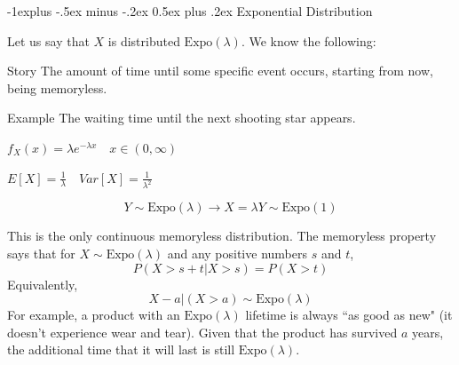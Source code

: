\documentclass[10pt,landscape]{article}
\makeatletter
\newcommand{\Expo}{\textrm{Expo}}
\renewcommand{\subsection}{\@startsection{subsection}{2}{0mm}%
{-1explus -.5ex minus -.2ex}%
{0.5ex plus .2ex}%
{\normalfont\normalsize\bfseries}}
\makeatother
\begin{document}
\begin{multicols*}{3}
        \subsection{Exponential Distribution}

        Let us say that $X$ is distributed $\Expo(\lambda)$. We know the following:
        \begin{description}
            \item{Story} The amount of time until some specific event occurs, starting from now, being memoryless. \item{Example} The waiting time until the next shooting star appears.

            \item[PDF] $f_X(x) = \lambda e^{-\lambda x} \quad x \in (0, \infty)$
            \item[Moments] $E[X]=\frac{1}{\lambda} \quad Var[X] = \frac{1}{\lambda^2}$
            \item[Expos as a rescaled Expo(1)]
            \[Y \sim \Expo(\lambda) \rightarrow X = \lambda Y \sim \Expo(1)\]


            \item[Memoryless] This is the only continuous memoryless distribution. The memoryless property says that for $X \sim \Expo(\lambda)$ and any positive numbers $s$ and $t$,
            \[P(X > s + t | X > s) = P(X > t)\]
            Equivalently,
            \[X - a | (X > a) \sim \Expo(\lambda)\]
            For example, a product with an $\Expo(\lambda)$ lifetime is always ``as good as new" (it doesn't experience wear and tear). Given that the product has survived $a$ years, the additional time that it will last is still $\Expo(\lambda)$.


\end{description}
\end{multicols*}
\end{document}
